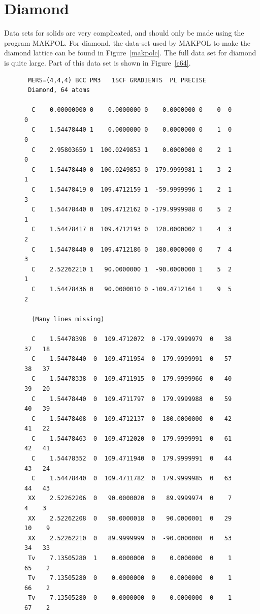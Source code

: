 \section{Diamond}
Data sets for solids are very complicated, and should only be made using
the program MAKPOL.  For diamond, the data-set used by MAKPOL to make the
diamond lattice can be found in Figure~\ref{makpolc}.  The full data set for
diamond is quite large.  Part of this data set is shown in Figure~\ref{c64}.
\begin{figure}
\begin{makeimage}
\end{makeimage}
\compresstable
\begin{verbatim}
 MERS=(4,4,4) BCC PM3   1SCF GRADIENTS  PL PRECISE
 Diamond, 64 atoms
 
  C    0.00000000 0    0.0000000 0    0.0000000 0    0  0  0
  C    1.54478440 1    0.0000000 0    0.0000000 0    1  0  0
  C    2.95803659 1  100.0249853 1    0.0000000 0    2  1  0
  C    1.54478440 0  100.0249853 0 -179.9999981 1    3  2  1
  C    1.54478419 0  109.4712159 1  -59.9999996 1    2  1  3
  C    1.54478440 0  109.4712162 0 -179.9999988 0    5  2  1
  C    1.54478417 0  109.4712193 0  120.0000002 1    4  3  2
  C    1.54478440 0  109.4712186 0  180.0000000 0    7  4  3
  C    2.52262210 1   90.0000000 1  -90.0000000 1    5  2  1
  C    1.54478436 0   90.0000010 0 -109.4712164 1    9  5  2

  (Many lines missing)

  C    1.54478398  0  109.4712072  0 -179.9999979  0   38   37   18
  C    1.54478440  0  109.4711954  0  179.9999991  0   57   38   37
  C    1.54478338  0  109.4711915  0  179.9999966  0   40   39   20
  C    1.54478440  0  109.4711797  0  179.9999988  0   59   40   39
  C    1.54478408  0  109.4712137  0  180.0000000  0   42   41   22
  C    1.54478463  0  109.4712020  0  179.9999991  0   61   42   41
  C    1.54478352  0  109.4711940  0  179.9999991  0   44   43   24
  C    1.54478440  0  109.4711782  0  179.9999985  0   63   44   43
 XX    2.52262206  0   90.0000020  0   89.9999974  0    7    4    3
 XX    2.52262208  0   90.0000018  0   90.0000001  0   29   10    9
 XX    2.52262210  0   89.9999999  0  -90.0000008  0   53   34   33
 Tv    7.13505280  1    0.0000000  0    0.0000000  0    1   65    2
 Tv    7.13505280  0    0.0000000  0    0.0000000  0    1   66    2
 Tv    7.13505280  0    0.0000000  0    0.0000000  0    1   67    2
\end{verbatim}


\end{figure}

